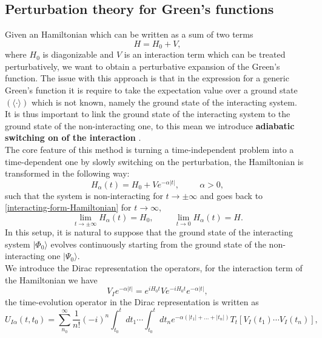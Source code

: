 \subsection{Perturbation theory for Green's functions}
Given an Hamiltonian which can be written as a sum of two terms
\begin{equation}
    H=H_0+V,
    \label{interacting-form-Hamiltonian}
\end{equation}
where $H_0$ is diagonizable and $V$ is an interaction term which can be treated perturbatively, we want to obtain a perturbative expansion 
of the Green's function. The issue with this approach is that in the expression for a generic Green's function it is require to take the expectation value  
over a ground state $(\langle \cdot \rangle)$ which is not known, namely the ground state of the interacting system.\\
It is thus important to link the ground state of the interacting system to the ground state of the non-interacting one, to this mean we 
introduce \textbf{adiabatic switching on of the interaction} \cite{nolting2009fundamentals}.\\
The core feature of this method is turning a time-independent problem into a time-dependent one by slowly switching on the perturbation, the Hamiltonian 
is transformed in the following way:
\begin{equation}
    H_\alpha(t)=H_0+Ve^{-\alpha|t|},\hspace{1cm}\alpha>0,
\end{equation}
such that the system is non-interacting for $t\to\pm\infty$ and goes back to \ref{interacting-form-Hamiltonian} for $t\to\infty$,
\begin{equation}
    \lim_{t\to\pm\infty}H_\alpha(t)=H_0,\hspace{1cm}\lim_{t\to 0}H_\alpha(t)=H.
\end{equation}
In this setup, it is natural to suppose that the ground state of the interacting system $|\Phi_0\rangle$ evolves continuously starting from 
the ground state of the non-interacting one $|\Psi_0\rangle$.\\
We introduce the Dirac representation the operators, for the interaction term of the Hamiltonian we have
\begin{equation}
    V_{I}e^{-\alpha |t|} = e^{iH_0t}Ve^{-iH_0t}e^{-\alpha|t|},
\end{equation}
the time-evolution operator in the Dirac representation is written as
\begin{equation}
    U_{I\alpha}(t,t_0)=\sum_{n_0}^\infty \frac{1}{n!}(-i)^n \int_{t_0}^t dt_1\cdots\int_{t_0}^t dt_n e^{-\alpha(|t_1|+...+|t_n|)}T_t\left[V_I(t_1)\cdots V_I(t_n)\right],
    \label{t-evolution-perturbatively}
\end{equation}
